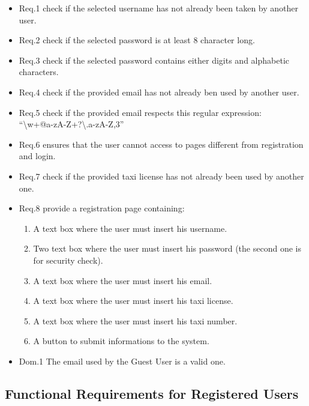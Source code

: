 \documentclass{report}
\begin{document}
				\begin{itemize}
					\item \lbrack Req.1\rbrack \label{sec:fr1_g3} check if the selected username has not already been taken by another user.
					\item \lbrack Req.2\rbrack \label{sec:fr2_g3} check if the selected password is at least 8 character long.
					\item \lbrack Req.3\rbrack \label{sec:fr3_g3} check if the selected password contains either digits and alphabetic characters.
					\item \lbrack Req.4\rbrack \label{sec:fr4_g3} check if the provided email has not already ben used by another user.
					\item \lbrack Req.5\rbrack \label{sec:fr5_g3} check if the provided email respects this regular expression:\\ \textquotedblleft\textbackslash w+@\lbrack a-zA-Z\textunderscore\rbrack +?\textbackslash .\lbrack a-zA-Z\rbrack{},3\textbraceright\textdollar\textquotedblright
					\item \lbrack Req.6\rbrack \label{sec:fr6_g3} ensures that the user cannot access to pages different from registration and login.
					\item \lbrack Req.7\rbrack \label{sec:fr7_g3} check if the provided taxi license has not already been used by another one.
					\item \lbrack Req.8\rbrack \label{sec:fr8_g3} provide a registration page containing:
						\begin{enumerate}
							\item A text box where the user must insert his username.
							\item Two text box where the user must insert his password (the second one is for security check).
							\item A text box where the user must insert his email.
							\item A text box where the user must insert his taxi license.
							\item A text box where the user must insert his taxi number.
							\item A button to submit informations to the system.
						\end{enumerate}
					\item \lbrack Dom.1\rbrack \label{sec:da1_g3} The email used by the Guest User is a valid one.
				\end{itemize}

		\subsection{Functional Requirements for Registered Users}
\end{document}
